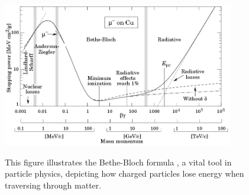 \begin{refsection}
        \begin{figure}
            \centering
            \includegraphics[width=0.9\textwidth]{Figures/muEDM/Entrance/BetheBloch.png}\\
            \caption{This figure illustrates the Bethe-Bloch formula \cite{PDG}, a vital tool in particle physics, depicting how charged particles lose energy when traversing through matter.}
            \label{fig:muEDM:entrance:BetheBloch}
        \end{figure}
        

\end{refsection}
